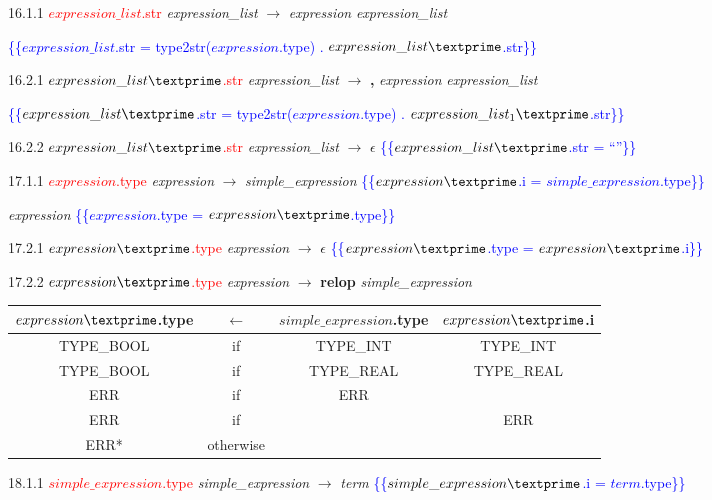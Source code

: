 16.1.1 \textcolor{red}{$expression\_list$.str} \emph{expression\_list} $\rightarrow$ \emph{expression} \emph{expression\_list\textprime}

\textcolor{blue}{\{\{$expression\_list$.str = type2str($expression$.type) . $expression\_list\textprime$.str\}\}}

16.2.1 \textcolor{red}{$expression\_list\textprime$.str} \emph{expression\_list\textprime} $\rightarrow$ \textbf{,} \emph{expression} \emph{expression\_list\textprime}

\textcolor{blue}{\{\{$expression\_list\textprime$.str = type2str($expression$.type) . $expression\_list_1\textprime$.str\}\}}

16.2.2 \textcolor{red}{$expression\_list\textprime$.str} \emph{expression\_list\textprime} $\rightarrow$ $\epsilon$ \textcolor{blue}{\{\{$expression\_list\textprime$.str = ``''\}\}}

17.1.1 \textcolor{red}{$expression$.type} \emph{expression} $\rightarrow$ \emph{simple\_expression} \textcolor{blue}{\{\{$expression\textprime$.i = $simple\_expression$.type\}\}}

\emph{expression\textprime} \textcolor{blue}{\{\{$expression$.type = $expression\textprime$.type\}\}}

17.2.1 \textcolor{red}{$expression\textprime$.type} \emph{expression\textprime} $\rightarrow$ $\epsilon$ \textcolor{blue}{\{\{$expression\textprime$.type = $expression\textprime$.i\}\}}

17.2.2 \textcolor{red}{$expression\textprime$.type} \emph{expression\textprime} $\rightarrow$ \textbf{relop} \emph{simple\_expression}

\begin{tabular}[t]{|c|c|c|c|}
  \hline

  $expression\textprime$.type & \textbf{$\leftarrow$} & $simple\_expression$.type & $expression\textprime$.i \\

  \hline

  TYPE_BOOL & if & TYPE_INT & TYPE_INT \\
  TYPE_BOOL & if & TYPE_REAL & TYPE_REAL \\
  ERR & if & ERR & \\
  ERR & if & & ERR \\
  ERR* & otherwise & & \\
  \hline

\end{tabular}

18.1.1 \textcolor{red}{$simple\_expression$.type} \emph{simple\_expression} $\rightarrow$ \emph{term} \textcolor{blue}{\{\{$simple\_expression\textprime$.i = $term$.type\}\}}

